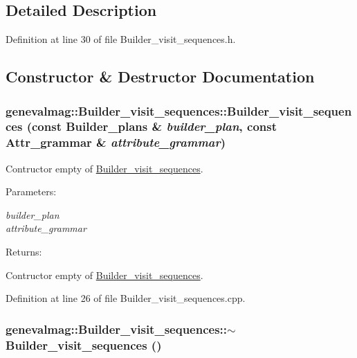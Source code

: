 \subsection{Detailed Description}


Definition at line 30 of file Builder\_\-visit\_\-sequences.h.

\subsection{Constructor \& Destructor Documentation}
\hypertarget{classgenevalmag_1_1Builder__visit__sequences_14404a9245e81db0b848226b33c4705c}{
\subsubsection[{Builder\_\-visit\_\-sequences}]{\setlength{\rightskip}{0pt plus 5cm}genevalmag::Builder\_\-visit\_\-sequences::Builder\_\-visit\_\-sequences (const {\bf Builder\_\-plans} \& {\em builder\_\-plan}, \/  const {\bf Attr\_\-grammar} \& {\em attribute\_\-grammar})}}
\label{classgenevalmag_1_1Builder__visit__sequences_14404a9245e81db0b848226b33c4705c}


Contructor empty of \hyperlink{classgenevalmag_1_1Builder__visit__sequences}{Builder\_\-visit\_\-sequences}. \begin{Desc}
\item[Parameters:]
\begin{description}
\item[{\em builder\_\-plan}]\item[{\em attribute\_\-grammar}]\end{description}
\end{Desc}
\begin{Desc}
\item[Returns:]\end{Desc}
Contructor empty of \hyperlink{classgenevalmag_1_1Builder__visit__sequences}{Builder\_\-visit\_\-sequences}. 

Definition at line 26 of file Builder\_\-visit\_\-sequences.cpp.\hypertarget{classgenevalmag_1_1Builder__visit__sequences_9b86db069a7c5564cf802bef80599a7d}{
\subsubsection[{$\sim$Builder\_\-visit\_\-sequences}]{\setlength{\rightskip}{0pt plus 5cm}genevalmag::Builder\_\-visit\_\-sequences::$\sim$Builder\_\-visit\_\-sequences ()}}
\label{classgenevalmag_1_1Builder__visit__sequences_9b86db069a7c5564cf802bef80599a7d}


